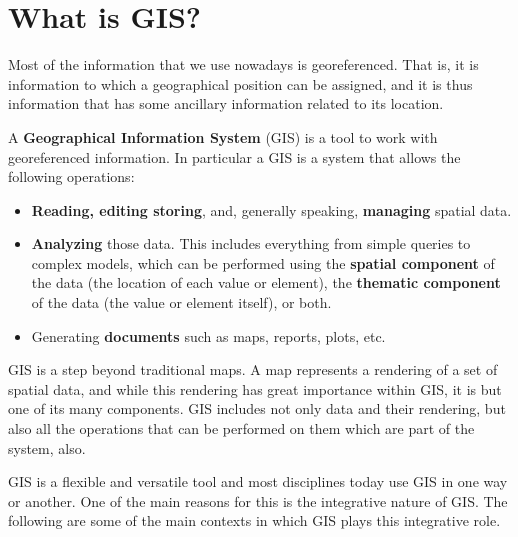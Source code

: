 
\chapter{What is GIS?}

\pagestyle{fancy}

Most of the information that we use nowadays is georeferenced. That is, it is information to which a geographical position can be assigned, and it is thus information that has some ancillary information related to its location.

A \textbf{Geographical Information System} (GIS) is a tool to work with georeferenced information. In particular a GIS is a system that allows the following operations:

\begin{itemize}
	\item \textbf{Reading, editing storing}, and, generally speaking, \textbf{ma\-na\-ging} spatial data.
	\item \textbf{Analyzing} those data. This includes everything from simple queries to complex models, which can be performed using the \textbf{spatial component} of the data (the location of each value or element), the \textbf{thematic component} of the data (the value or element itself), or both.
	\item Generating \textbf{documents} such as maps, reports, plots, etc.
\end{itemize}


GIS is a step beyond traditional maps. A map represents a rendering of a set of spatial data, and while this rendering has great importance within GIS, it is but one of its many components. GIS includes not only data and their rendering, but also all the operations that can be performed on them which are part of the system, also.

GIS is a flexible and versatile tool and most disciplines today use GIS in one way or another. One of the main reasons for this is the integrative nature of GIS. The following are some of the main contexts in which GIS plays this integrative role.


